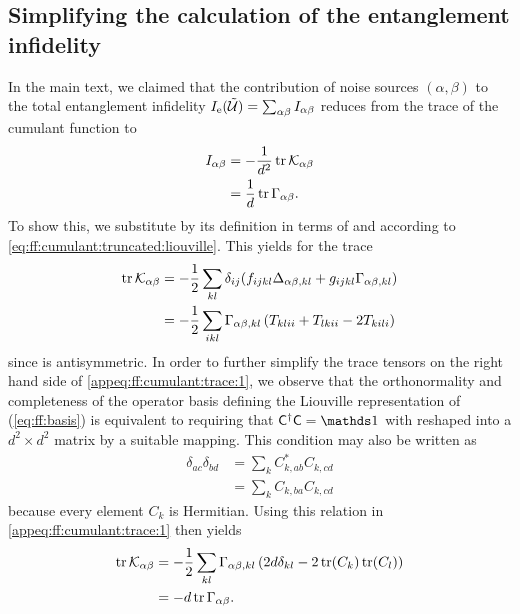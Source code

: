 \subsection{Simplifying the calculation of the entanglement infidelity}\label{subsec:app:ff:derivations:fidelity}
In the main text, we claimed that the contribution of noise sources $(\alpha,\beta)$ to the total entanglement infidelity $I_{\mathrm{e}}(\mathcal{\tilde{U}}) = \sum_{\alpha\beta}I_{\alpha\beta}$ reduces from the trace of the cumulant function \cumulantfun to
\begin{align}
    I_{\alpha\beta} &= -\frac{1}{d^2}\tr\mathcal{K}_{\alpha\beta} \label{appeq:ff:infid} \\
                         &= \frac{1}{d}\tr\Gamma_{\alpha\beta}.
\end{align}
To show this, we substitute \cumulantfun by its definition in terms of \freqshifts and \decayamps according to \cref{eq:ff:cumulant:truncated:liouville}.
This yields for the trace
\begin{equation}\label{appeq:ff:cumulant:trace:1}
    \begin{split}
        \tr\mathcal{K}_{\alpha\beta} &= -\frac{1}{2}\sum_{kl}\delta_{ij}(f_{ijkl}\Delta_{\alpha\beta,kl} + g_{ijkl}\Gamma_{\alpha\beta,kl}) \\
                                      &= -\frac{1}{2}\sum_{ikl}\Gamma_{\alpha\beta,kl}\left(T_{klii} + T_{lkii} - 2 T_{kili}\right)
    \end{split}
\end{equation}
since \freqshifts is antisymmetric.
In order to further simplify the trace tensors on the right hand side of \cref{appeq:ff:cumulant:trace:1}, we observe that the orthonormality and completeness of the operator basis \basis defining the Liouville representation of \cumulantfun (\cf \cref{eq:ff:basis}) is equivalent to requiring that $\basis\adjoint\basis = \eye$ with \basis reshaped into a $d^2\times d^2$ matrix by a suitable mapping.
This condition may also be written as
\begin{equation}\label{eq:ff:basis:identity}
\begin{split}
    \delta_{ac}\delta_{bd} &= \sum_{k} C^\ast_{k,ab} C_{k,cd} \\
                           &= \sum_{k} C_{k,ba} C_{k,cd}
\end{split}
\end{equation}
because every element $C_k$ is Hermitian.
Using this relation in \cref{appeq:ff:cumulant:trace:1} then yields
\begin{equation}\label{appeq:ff:cumulant:trace:2}
    \begin{split}
        \tr\mathcal{K}_{\alpha\beta} &= -\frac{1}{2}\sum_{kl}\Gamma_{\alpha\beta,kl}\left(2d\delta_{kl} - 2\tr(C_k)\tr(C_l)\right) \\
                                      &= -d\tr\Gamma_{\alpha\beta}.
    \end{split}
\end{equation}
